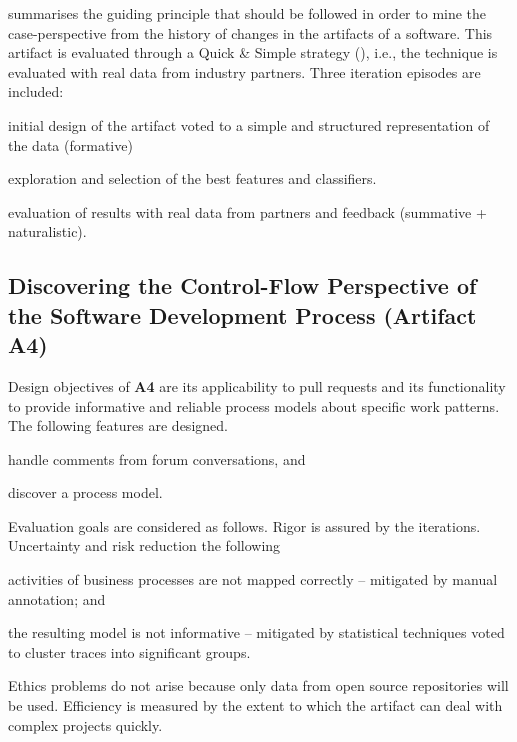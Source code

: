  summarises the guiding principle that should be followed in order to mine the case-perspective from the history of changes in the artifacts of a software. This artifact is evaluated through a Quick \& Simple strategy (\cite{Venable2016}), i.e., the technique is evaluated with real data from industry partners. Three iteration episodes are included: 
\begin{iiilist}
	\item initial design of the artifact voted to a simple and structured representation of the data (formative)
	\item exploration and selection of the best features and classifiers.
	\item evaluation of results with real data from partners and feedback (summative + naturalistic).
\end{iiilist}

\subsection{Discovering the Control-Flow Perspective of the Software Development Process (Artifact A4)} 
Design objectives of \textbf{A4} are its applicability to pull requests and its functionality to provide informative and reliable process models about specific work patterns. The following features are designed.
\begin{iiilist}
	\item handle comments from forum conversations, and
	\item discover a process model.
\end{iiilist}
Evaluation goals are considered as follows. Rigor is assured by the iterations. Uncertainty and risk reduction the following
\begin{iiilist}
	\item activities of business processes are not mapped correctly -- mitigated by manual annotation; and
	\item the resulting model is not informative -- mitigated by statistical techniques voted to cluster traces into significant groups.
\end{iiilist} Ethics problems do not arise because only data from open source repositories will be used. Efficiency is measured by the extent to which the artifact can deal with complex projects quickly.



